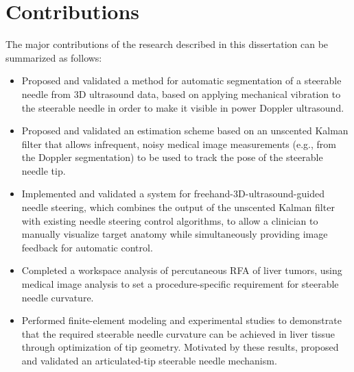 \section{Contributions}
The major contributions of the research described in this dissertation can be summarized as follows:
\begin{itemize}
\item Proposed and validated a method for automatic segmentation of a steerable needle from 3D ultrasound data, based on applying mechanical vibration to the steerable needle in order to make it visible in power Doppler ultrasound.
\item Proposed and validated an estimation scheme based on an unscented Kalman filter that allows infrequent, noisy medical image measurements (e.g., from the Doppler segmentation) to be used to track the pose of the steerable needle tip.
\item Implemented and validated a system for freehand-3D-ultrasound-guided needle steering, which combines the output of the unscented Kalman filter with existing needle steering control algorithms, to allow a clinician to manually visualize target anatomy while simultaneously providing image feedback for automatic control.  
\item Completed a workspace analysis of percutaneous RFA of liver tumors, using medical image analysis to set a procedure-specific requirement for steerable needle curvature.  
\item Performed finite-element modeling and experimental studies to demonstrate that the required steerable needle curvature can be achieved in liver tissue through optimization of tip geometry. Motivated by these results, proposed and validated an articulated-tip steerable needle mechanism.   
\end{itemize}

